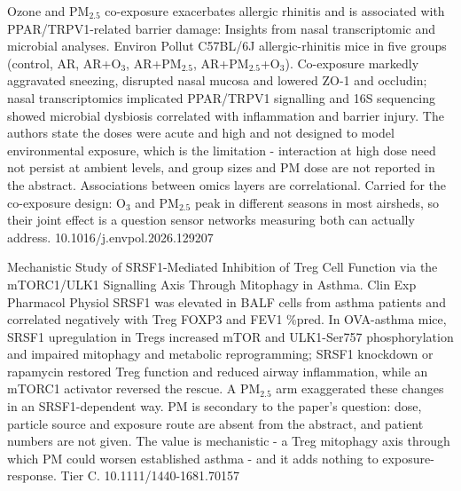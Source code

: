 \documentclass[10pt]{article}
\begin{document}

{Ozone and PM$_{2.5}$ co-exposure exacerbates allergic rhinitis and is associated with PPAR/TRPV1-related barrier damage: Insights from nasal transcriptomic and microbial analyses.}
{Environ Pollut}
{C57BL/6J allergic-rhinitis mice in five groups (control, AR, AR+O$_3$, AR+PM$_{2.5}$, AR+PM$_{2.5}$+O$_3$). Co-exposure markedly aggravated sneezing, disrupted nasal mucosa and lowered ZO-1 and occludin; nasal transcriptomics implicated PPAR/TRPV1 signalling and 16S sequencing showed microbial dysbiosis correlated with inflammation and barrier injury. The authors state the doses were acute and high and not designed to model environmental exposure, which is the limitation - interaction at high dose need not persist at ambient levels, and group sizes and PM dose are not reported in the abstract. Associations between omics layers are correlational. Carried for the co-exposure design: O$_3$ and PM$_{2.5}$ peak in different seasons in most airsheds, so their joint effect is a question sensor networks measuring both can actually address.}
{10.1016/j.envpol.2026.129207}

{Mechanistic Study of SRSF1-Mediated Inhibition of Treg Cell Function via the mTORC1/ULK1 Signalling Axis Through Mitophagy in Asthma.}
{Clin Exp Pharmacol Physiol}
{SRSF1 was elevated in BALF cells from asthma patients and correlated negatively with Treg FOXP3 and FEV1 \%pred. In OVA-asthma mice, SRSF1 upregulation in Tregs increased mTOR and ULK1-Ser757 phosphorylation and impaired mitophagy and metabolic reprogramming; SRSF1 knockdown or rapamycin restored Treg function and reduced airway inflammation, while an mTORC1 activator reversed the rescue. A PM$_{2.5}$ arm exaggerated these changes in an SRSF1-dependent way. PM is secondary to the paper's question: dose, particle source and exposure route are absent from the abstract, and patient numbers are not given. The value is mechanistic - a Treg mitophagy axis through which PM could worsen established asthma - and it adds nothing to exposure-response. Tier C.}
{10.1111/1440-1681.70157}

\end{document}
